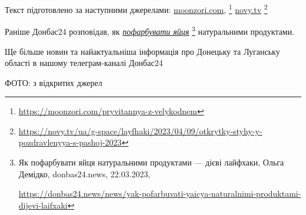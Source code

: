 Текст підготовлено за наступними джерелами: \href{https://moonzori.com/pryvitannya-z-velykodnem}{moonzori.com},%
\footnote{\url{https://moonzori.com/pryvitannya-z-velykodnem}}
\href{https://novy.tv/ua/g-space/layfhaki/2023/04/09/otkrytky-styhy-y-pozdravlenyya-s-pashoj-2023}{novy.tv}
\footnote{\url{https://novy.tv/ua/g-space/layfhaki/2023/04/09/otkrytky-styhy-y-pozdravlenyya-s-pashoj-2023}}

Раніше Донбас24 розповідав, як \href{https://donbas24.news/news/yak-pofarbuvati-yaicya-naturalnimi-produktami-dijevi-laifxaki}{\emph{пофарбувати яйця}}%
\footnote{Як пофарбувати яйця натуральними продуктами — дієві лайфхаки, Ольга Демідко, donbas24.news, 22.03.2023, \par\url{https://donbas24.news/news/yak-pofarbuvati-yaicya-naturalnimi-produktami-dijevi-laifxaki}}
натуральними продуктами.

Ще більше новин та найактуальніша інформація про Донецьку та Луганську області
в нашому телеграм-каналі Донбас24

ФОТО: з відкритих джерел

